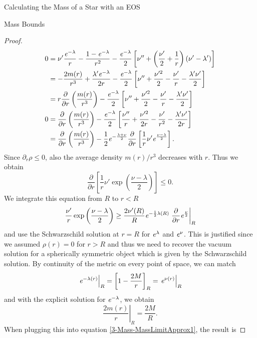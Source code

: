 \begin{section}{Calculating the Mass of a Star with an EOS}
\begin{subsection}{Mass Bounds}
\begin{proof}
	\begin{align}
		0 &= \nu'\frac{\mathit{e}^{-\lambda}}{r} - \frac{1-\mathit{e}^{-\lambda}}{r^2} - \frac{\mathit{e}^{-\lambda}}{2}\left[\nu''+\left(\frac{\nu'}{2} + \frac{1}{r}\right)\left(\nu'-\lambda'\right) \right]\\
		&= - \frac{2m(r)}{r^3} + \frac{\lambda'\mathit{e}^{-\lambda}}{2r} -  \frac{\mathit{e}^{-\lambda}}{2}\left[\nu''+ \frac{\nu'^2}{2} - \frac{\nu'}{r} -\frac{\lambda'\nu'}{2}\right]\\
		&= r\frac{\partial}{\partial r}\left(\frac{m(r)}{r^3}\right) - \frac{\mathit{e}^{-\lambda}}{2}\left[\nu''+ \frac{\nu'^2}{2} - \frac{\nu'}{r} -\frac{\lambda'\nu'}{2}\right]\\
		0 &= \frac{\partial}{\partial r}\left(\frac{m(r)}{r^3}\right) - \frac{\mathit{e}^{-\lambda}}{2}\left[\frac{\nu''}{r}+ \frac{\nu'^2}{2r} - \frac{\nu'}{r^2} -\frac{\lambda'\nu'}{2r}\right]\\
		&= \frac{\partial}{\partial r}\left(\frac{m(r)}{r^3}\right) - \frac{1}{2}\mathit{e}^{-\frac{\lambda+\nu}{2}}\frac{\partial}{\partial r}\left[\frac{1}{r}\nu'\mathit{e}^{\frac{\nu-\lambda}{2}}\right].
	\end{align}
	Since $\partial_r\rho\leq0$, also the average density $m(r)/r^3$ decreases with $r$. Thus we obtain
	\begin{equation}
		\frac{\partial}{\partial r}\left[\frac{1}{r}\nu'\exp\left(\frac{\nu-\lambda}{2}\right) \right] \leq 0.
	\end{equation}
	We integrate this equation from $R$ to $r<R$
	\begin{equation}
		\frac{\nu'}{r}\exp\left(\frac{\nu-\lambda}{2}\right)\geq\frac{2\nu'(R)}{R}\mathit{e}^{-\frac{1}{2}\lambda(R)}\left.\frac{\partial}{\partial r}\mathit{e}^{\frac{\nu}{2}}\right|_R
	\end{equation}
	and use the Schwarzschild solution at $r=R$ for $\mathit{e}^\lambda$ and $\mathit{e}^\nu$. 
	This is justified since we assumed $\rho(r)=0$ for $r>R$ and thus we need to recover the vacuum solution for a spherically symmetric object which is given by the Schwarzschild solution. 
	By continuity of the metric on every point of space, we can match 
	\begin{equation}
		\left.\mathit{e}^{-\lambda(r)}\right|_R=\left[1-\frac{2M}{r}\right]_R=\left.\mathit{e}^{\nu(r)}\right|_R
		\label{3-Mass-MassLimitApprox1}
	\end{equation}
	and with the explicit solution for $\mathit{e}^{-\lambda}$, we obtain
	\begin{equation}
		\left.\frac{2m(r)}{r}\right|_R = \frac{2M}{R}.
	\end{equation}
	When plugging this into equation \eqref{3-Mass-MassLimitApprox1}, the result is

\end{proof}
\end{subsection}
\end{section}
